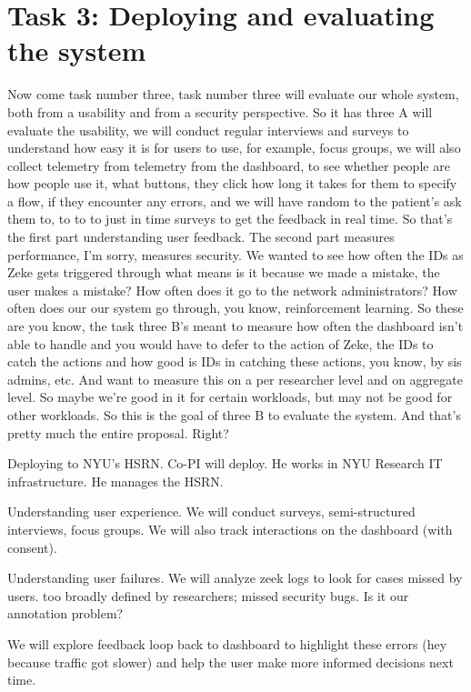 \section{Task 3: Deploying and evaluating the system}


Now come task number three, task number three will evaluate our whole system, both from a usability and from a security perspective. So it has three A will evaluate the usability, we will conduct regular interviews and surveys to understand how easy it is for users to use, for example, focus groups, we will also collect telemetry from telemetry from the dashboard, to see whether people are how people use it, what buttons, they click how long it takes for them to specify a flow, if they encounter any errors, and we will have random to the patient's ask them to, to to to just in time surveys to get the feedback in real time. So that's the first part understanding user feedback. The second part measures performance, I'm sorry, measures security. We wanted to see how often the IDs as Zeke gets triggered through what means is it because we made a mistake, the user makes a mistake? How often does it go to the network administrators? How often does our our system go through, you know, reinforcement learning. So these are you know, the task three B's meant to measure how often the dashboard isn't able to handle and you would have to defer to the action of Zeke, the IDs to catch the actions and how good is IDs in catching these actions, you know, by sis admins, etc. And want to measure this on a per researcher level and on aggregate level. So maybe we're good in it for certain workloads, but may not be good for other workloads. So this is the goal of three B to evaluate the system. And that's pretty much the entire proposal. Right?




Deploying to NYU's HSRN. Co-PI will deploy. He works in NYU Research IT infrastructure. He manages the HSRN.

Understanding user experience. We will conduct surveys, semi-structured interviews, focus groups. We will also track interactions on the dashboard (with consent).

Understanding user failures. We will analyze zeek logs to look for cases missed by users. too broadly defined by researchers; missed security bugs.  Is it our annotation problem?

We will explore feedback loop back to dashboard to highlight these errors (hey because traffic got slower) and help the user make more informed decisions next time.

